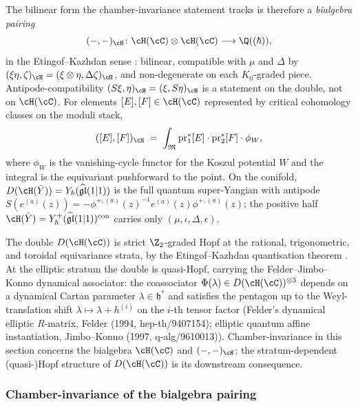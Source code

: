 The bilinear form the chamber-invariance statement tracks is therefore
a \emph{bialgebra pairing}
\[
 (-, -)_\cH \colon \cH(\cC) \otimes \cH(\cC) \longrightarrow \Q((\hbar)),
\]
in the Etingof--Kazhdan sense \cite[\S 3]{EtingofKazhdan1996}: bilinear,
compatible with $\mu$ and $\Delta$ by
$(\xi \eta, \zeta)_\cH = (\xi \otimes \eta, \Delta \zeta)_\cH$, and
non-degenerate on each $K_0$-graded piece. Antipode-compatibility
$(S\xi, \eta)_\cH = (\xi, S\eta)_\cH$ is a statement on the double, not
on $\cH(\cC)$. For elements $[E], [F] \in \cH(\cC)$ represented by
critical cohomology classes on the moduli stack,
\[
 ([E], [F])_\cH \;=\; \int_{\mathfrak{M}} \mathrm{pr}_1^*[E] \cdot \mathrm{pr}_2^*[F] \cdot \phi_W,
\]
where $\phi_W$ is the vanishing-cycle functor for the Koszul potential
$W$ and the integral is the equivariant pushforward to the point. On the
conifold, $D(\cH(\bar{Y})) = Y_{\hbar}(\widehat{\mathfrak{gl}}(1|1))$ is
the full quantum super-Yangian with antipode
$S(e^{(a)}(z)) = -\phi^{+,(a)}(z)^{-1} e^{(a)}(z) \phi^{+,(a)}(z)$; the
positive half
$\cH(\bar Y) = Y^+_{\hbar}(\widehat{\mathfrak{gl}}(1|1))^{\mathrm{con}}$
carries only $(\mu, \iota, \Delta, \epsilon)$.

\begin{remark}
 \label{rem:hopf-scope-stratified}
 The double $D(\cH(\cC))$ is strict $\Z_2$-graded Hopf at the rational,
 trigonometric, and toroidal equivariance strata, by the
 Etingof--Kazhdan quantisation theorem
 \cite{EtingofKazhdan1996}. At the elliptic stratum the
 double is quasi-Hopf, carrying the Felder--Jimbo--Konno dynamical
 associator: the coassociator $\Phi(\lambda) \in D(\cH(\cC))^{\otimes 3}$
 depends on a dynamical Cartan parameter $\lambda \in \mathfrak{h}^*$
 and satisfies the pentagon up to the Weyl-translation shift
 $\lambda \mapsto \lambda + h^{(i)}$ on the $i$-th tensor factor (Felder's
 dynamical elliptic $R$-matrix, Felder (1994, hep-th/9407154); elliptic
 quantum affine instantiation, Jimbo--Konno (1997, q-alg/9610013)).
 Chamber-invariance in this section concerns the bialgebra $\cH(\cC)$
 and $(-,-)_\cH$; the stratum-dependent (quasi-)Hopf structure of
 $D(\cH(\cC))$ is its downstream consequence.
\end{remark}

\subsubsection{Chamber-invariance of the bialgebra pairing}
\label{subsec:chamber-invariance-pairing}

